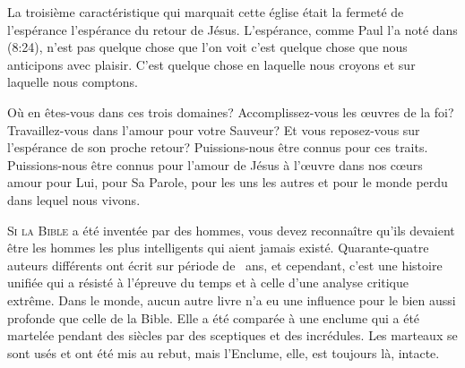 
La troisième caractéristique qui marquait cette église était la fermeté
 de l'espérance \ocadr l'espérance du retour de Jésus.
 L'espérance, comme Paul l'a noté dans (8:24),
 n'est pas quelque chose que l'on voit \ocadr c'est quelque chose que nous
 anticipons avec plaisir. C'est quelque chose en laquelle nous croyons
 et sur laquelle nous comptons.

Où en êtes-vous dans ces trois domaines? Accomplissez-vous
 les \oe{}uvres de la foi? Travaillez-vous dans l'amour pour votre Sauveur?
 Et vous reposez-vous sur l'espérance de son proche retour?
 Puissions-nous être connus pour ces traits. Puissions-nous être connus
 pour l'amour de Jésus à l'\oe{}uvre dans nos c\oe{}urs
 \ocadr amour pour Lui, pour Sa Parole, pour les uns les autres 
 et pour le monde perdu dans lequel nous vivons.

\dvrule






\lettrine{S}{i la Bible} a été inventée par des hommes, vous devez reconnaître
 qu'ils devaient être les hommes les plus intelligents qui aient jamais existé.
 Quarante-quatre auteurs différents ont écrit
 sur période de ~ans, et cependant, c'est une histoire unifiée
 qui a résisté à l'épreuve du temps et à celle d'une analyse critique extrême.
 Dans le monde, aucun autre livre n'a eu une influence pour le bien aussi
 profonde que celle de la Bible. Elle a été comparée à une enclume
 qui a été martelée pendant des siècles par des sceptiques et des incrédules.
 Les marteaux se sont usés et ont été mis au rebut, mais l'Enclume,
 elle, est toujours là, intacte.


